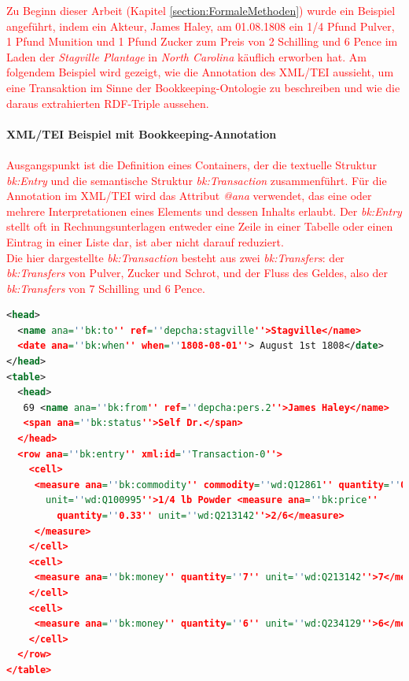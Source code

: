 \documentclass[12pt,a4paper]{article}
\begin{document}
\textcolor{red}{
Zu Beginn dieser Arbeit (Kapitel \ref{section:FormaleMethoden}) wurde ein Beispiel angeführt, indem ein Akteur, James Haley, am 01.08.1808 ein 1/4 Pfund Pulver, 1 Pfund Munition und 1 Pfund Zucker zum Preis von 2 Schilling und 6 Pence im Laden der \textit{Stagville Plantage} in \textit{North Carolina} käuflich erworben hat. Am folgendem Beispiel wird gezeigt, wie die Annotation des XML/TEI aussieht, um eine Transaktion im Sinne der Bookkeeping-Ontologie zu beschreiben und wie die daraus extrahierten RDF-Triple aussehen.}
\\
\\
\textbf{XML/TEI Beispiel mit Bookkeeping-Annotation}
\\
\\
\textcolor{red}{
Ausgangspunkt ist die Definition eines Containers, der die textuelle Struktur \textit{bk:Entry} und die semantische Struktur \textit{bk:Transaction} zusammenführt. Für die Annotation im XML/TEI wird das Attribut \textit{@ana} verwendet, das eine oder mehrere Interpretationen eines Elements und dessen Inhalts erlaubt. Der \textit{bk:Entry} stellt oft in Rechnungsunterlagen entweder eine Zeile in einer Tabelle oder einen Eintrag in einer Liste dar, ist aber nicht darauf reduziert.
\\
Die hier dargestellte \textit{bk:Transaction} besteht aus zwei \textit{bk:Transfers}: der \textit{bk:Transfers} von Pulver, Zucker und Schrot, und der Fluss des Geldes, also der \textit{bk:Transfers} von 7 Schilling und 6 Pence.
}
\begin{lstlisting}[language=XML]
<head> 
  <name ana=''bk:to'' ref=''depcha:stagville''>Stagville</name> 
  <date ana=''bk:when'' when=''1808-08-01''> August 1st 1808</date>
</head> 
<table>
  <head>
   69 <name ana=''bk:from'' ref=''depcha:pers.2''>James Haley</name> 
   <span ana=''bk:status''>Self Dr.</span> 
  </head> 
  <row ana=''bk:entry'' xml:id=''Transaction-0''> 
    <cell> 
     <measure ana=''bk:commodity'' commodity=''wd:Q12861'' quantity=''0.25'' 
       unit=''wd:Q100995''>1/4 lb Powder <measure ana=''bk:price'' 
         quantity=''0.33'' unit=''wd:Q213142''>2/6</measure>
     </measure>
    </cell> 
    <cell> 
     <measure ana=''bk:money'' quantity=''7'' unit=''wd:Q213142''>7</measure>
    </cell>
    <cell> 
     <measure ana=''bk:money'' quantity=''6'' unit=''wd:Q234129''>6</measure>
    </cell>
  </row>
</table>
\end{lstlisting}
\end{document}

